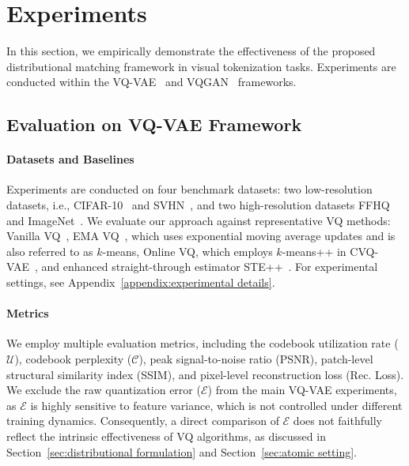 \section{Experiments}\label{sec:experiments}
In this section, we empirically demonstrate the effectiveness of the proposed distributional matching framework in visual tokenization tasks.
Experiments are conducted within the VQ-VAE~\cite{Oord2017NeuralDR} and VQGAN~\cite{Esser2020TamingTF} frameworks. %

\subsection{Evaluation on VQ-VAE Framework}
\label{sec:vqvae experiments}
\paragraph{Datasets and Baselines} Experiments are conducted on four benchmark datasets: two low-resolution datasets, i.e., CIFAR-10~\cite{Krizhevsky2009LearningML} and SVHN~\cite{Netzer2011ReadingDI},  and two high-resolution datasets FFHQ~\cite{Karras2018ASG} and ImageNet~\cite{Deng2009ImageNetAL}. We evaluate our approach against representative VQ methods:  Vanilla VQ~\cite{Oord2017NeuralDR}, EMA VQ~\cite{Razavi2019GeneratingDH}, which uses exponential moving average updates and is also referred to as $k$-means, Online VQ, which employs $k$-means++ in CVQ-VAE~\cite{Zheng2023OnlineCC}, and enhanced  straight-through estimator STE++~\cite{Huh2023StraighteningOT}. For experimental settings, see Appendix~\ref{appendix:experimental details}. 

\paragraph{Metrics}
We employ multiple evaluation metrics, including the codebook utilization rate ($\mathcal{U}$), codebook perplexity ($\mathcal{C}$), peak signal-to-noise ratio (PSNR), patch-level structural similarity index (SSIM), and pixel-level reconstruction loss (Rec. Loss).
We exclude the raw quantization error ($\mathcal{E}$) from the main VQ-VAE experiments, as $\mathcal{E}$ is highly sensitive to feature variance, which is not controlled under different training dynamics. Consequently, a direct comparison of $\mathcal{E}$ does not faithfully reflect the intrinsic effectiveness of VQ algorithms, as discussed in Section~\ref{sec:distributional formulation} and Section~\ref{sec:atomic setting}.

